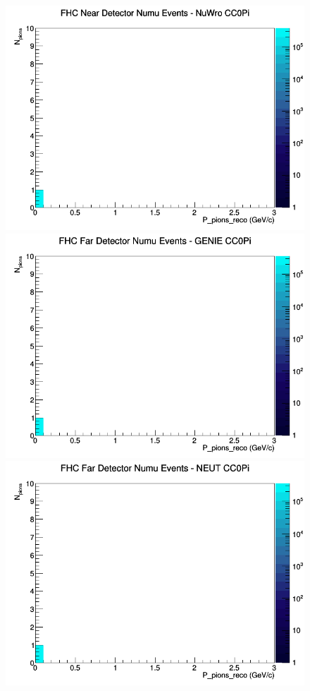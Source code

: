 \documentclass[12pt]{article}
\begin{document}
\begin{figure}[h]
\includegraphics[width=\linewidth]{eff_N_P/LAr/pions/CC0Pi_FHC_ND_numu_N_P_NuWro.png}
\endminipage
\newline
{}
\includegraphics[width=\linewidth]{eff_N_P/LAr/pions/CC0Pi_FHC_FD_numu_N_P_GENIE.png}
\endminipage
{}
\includegraphics[width=\linewidth]{eff_N_P/LAr/pions/CC0Pi_FHC_FD_numu_N_P_NEUT.png}

\end{figure}
\end{document}
